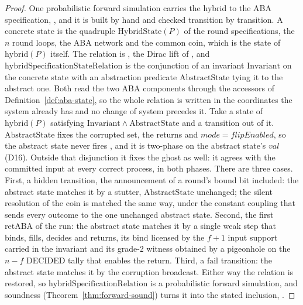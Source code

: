 \begin{proof}\leanok
  One probabilistic forward simulation carries the hybrid to the ABA specification, , and it is built by hand and checked transition by transition.
  A concrete state is the quadruple $\mathrm{HybridState}(P)$ of the round specifications, the $n$ round loops, the ABA network and the common coin, which is the state of $\mathrm{hybrid}(P)$ itself.
  The relation is , the Dirac lift of , and $\mathrm{hybridSpecificationStateRelation}$ is the conjunction of an invariant $\mathrm{Invariant}$ on the concrete state with an abstraction predicate $\mathrm{AbstractState}$ tying it to the abstract one.
  Both read the two ABA components through the accessors of Definition~\ref{def:aba-state}, so the whole relation is written in the coordinates the system already has and no change of system precedes it.
  Take a state of $\mathrm{hybrid}(P)$ satisfying $\mathrm{Invariant} \wedge \mathrm{AbstractState}$ and a transition out of it.
  $\mathrm{AbstractState}$ fixes the corrupted set, the returns and $mode = flipEnabled$, so the abstract state never fires , and it is two-phase on the abstract state's $val$ (D16).
  Outside that disjunction it fixes the ghost as well: it agrees with the committed input at every correct process, in both phases.
  There are three cases.
  First, a hidden transition, the announcement of a round's bound bit included: the abstract state matches it by a stutter, $\mathrm{AbstractState}$ unchanged; the silent resolution of the coin is matched the same way, under the constant coupling that sends every outcome to the one unchanged abstract state.
  Second, the first $\mathrm{retABA}$ of the run: the abstract state matches it by a single weak step that binds, fills, decides and returns, its bind licensed by the $f{+}1$ input support carried in the invariant and its grade-2 witness obtained by a pigeonhole on the $n-f$ DECIDED tally that enables the return.
  Third, a $\mathrm{fail}$ transition: the abstract state matches it by the corruption broadcast.
  Either way the relation is restored, so $\mathrm{hybridSpecificationRelation}$ is a probabilistic forward simulation, and soundness (Theorem~\ref{thm:forward-sound}) turns it into the stated inclusion, .
\end{proof}
